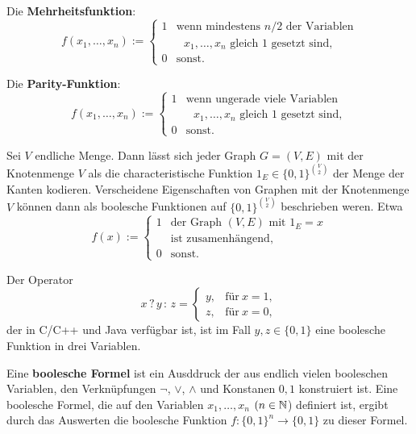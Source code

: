 \begin{bsp}\
	\begin{enuma} 
		\item Die \textbf{Mehrheitsfunktion}:
		\[
		f (x_1,\ldots,x_n) := \begin{cases} 
			1 & \text{wenn mindestens $n/2$ der Variablen}
			\\ & 		\text{ $x_1,\ldots,x_n$ gleich $1$ gesetzt sind}, 
			\\ 0 & \text{sonst}. 
		\end{cases} 
		\]
		\item Die \textbf{Parity-Funktion}: 
		\[
		f (x_1,\ldots,x_n) := \begin{cases} 
			1 & \text{wenn ungerade viele Variablen}
			\\ & 		\text{ $x_1,\ldots,x_n$ gleich $1$ gesetzt sind}, 
			\\ 0 & \text{sonst}. 
		\end{cases} 
		\]
		\item Sei $V$ endliche Menge. Dann lässt sich jeder Graph $G = (V,E)$ mit der Knotenmenge $V$ als die characteristische Funktion $1_E \in \{0,1\}^{\binom{V}{2}}$ der Menge der Kanten kodieren. Verscheidene Eigenschaften von Graphen mit der Knotenmenge $V$ können dann als boolesche Funktionen auf $\{0,1\}^{\binom{V}{2}}$ beschrieben weren. Etwa 
		\[
			f(x) := \begin{cases} 1 & \text{der Graph $(V,E)$ mit $1_E=x$} 
				\\ & \text{ist zusamenhängend}, 
				\\0  & \text{sonst}.
				\end{cases} 
		\]
		\item Der Operator
		\[
			  x \, ?\, y \, :\, z = \begin{cases}
			  			y, & \text{für} \ x =1,
			  			\\ z, & \text{für} \  x=0,
			  	\end{cases} 
		\]
		der in C/C++ und Java verfügbar ist, ist im Fall $y,z \in \{0,1\}$ eine boolesche Funktion in drei Variablen. 
	\end{enuma}
\end{bsp}

\begin{defn}
	Eine \textbf{boolesche Formel} ist ein Ausddruck der aus endlich vielen booleschen Variablen, den Verknüpfungen $\neg$, $\vee$, $\wedge$ und Konstanen $0,1$ konstruiert ist. Eine boolesche Formel, die auf den Variablen  $x_1,\ldots,x_n$ $(n \in \mathbb{N}$) definiert ist, ergibt durch das Auswerten die boolesche Funktion $f : \{0,1\}^n \to \{0,1\}$ zu dieser Formel. 
\end{defn} 

